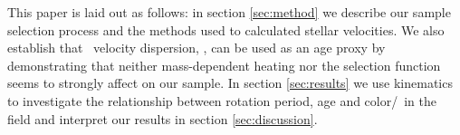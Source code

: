 This paper is laid out as follows: in section \ref{sec:method} we describe our
sample selection process and the methods used to calculated stellar
velocities.
We also establish that \vb\ velocity dispersion, \sigmavb, can be used as an
age proxy by demonstrating that neither mass-dependent heating nor the
selection function seems to strongly affect on our sample.
In section \ref{sec:results} we use kinematics to investigate the
relationship between rotation period, age and color/\teff\ in the field and
interpret our results in section \ref{sec:discussion}.


